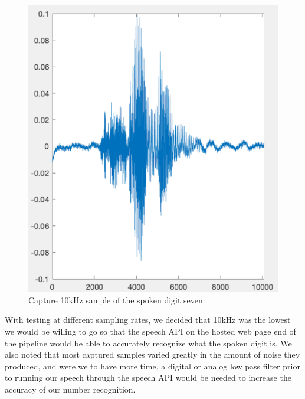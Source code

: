 \begin{figure}[h]
	\caption{Capture 10kHz sample of the spoken digit seven}\label{fig:speechseven}
	\begin{center}
		\includegraphics[scale=0.5]{speech_seven}
	\end{center}
\end{figure}

With testing at different sampling rates, we decided that 10kHz was the lowest we would be willing to go so that the speech API on the hosted web page end of the pipeline would be able to accurately recognize what the spoken digit is. We also noted that most captured samples varied greatly in the amount of noise they produced, and were we to have more time, a digital or analog low pass filter prior to running our speech through the speech API would be needed to increase the accuracy of our number recognition.


